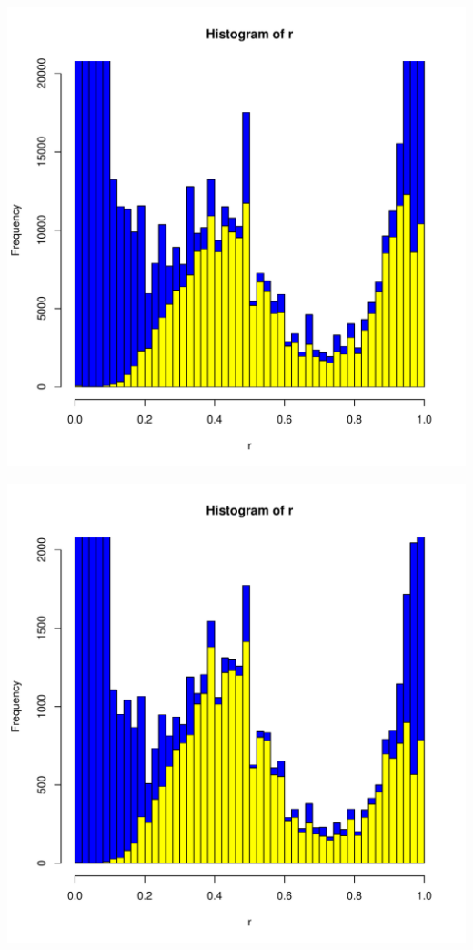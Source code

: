 \documentclass{article}\usepackage[]{graphicx}\usepackage[]{color}
\makeatletter
\def\maxwidth{ %
  \ifdim\Gin@nat@width>\linewidth
    \linewidth
  \else
    \Gin@nat@width
  \fi
}
\newenvironment{knitrout}{}{} %
\makeatother
\begin{document}
\begin{knitrout}
\includegraphics[width=\maxwidth]{FigS7-hwe-histo-figs-knitr/unnamed-chunk-12-6} 

\includegraphics[width=\maxwidth]{FigS7-hwe-histo-figs-knitr/unnamed-chunk-12-7} 


\end{knitrout}
\end{document}
